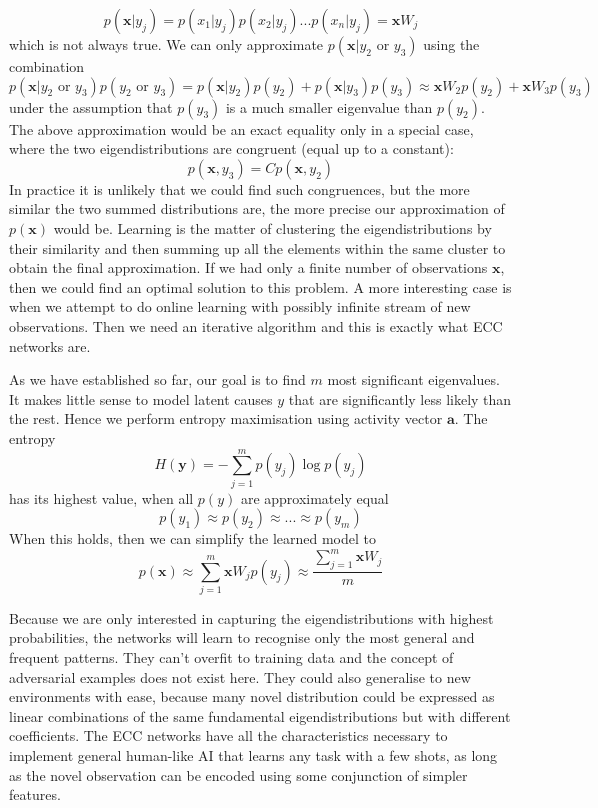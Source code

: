 \documentclass[12pt]{article}
\begin{document}
\[
p(\boldsymbol{x}|y_j) = p(x_1|y_j)p(x_2|y_j)...p(x_n|y_j) = \boldsymbol{x} W_j
\]
which is not always true. We can only approximate $p(\boldsymbol{x}|y_2\text{ or }y_3)$
using the combination
\[
p(\boldsymbol{x}|y_2\text{ or }y_3) p(y_2\text{ or }y_3)= p(\boldsymbol{x}|y_2) p(y_2)+p(\boldsymbol{x}|y_3) p(y_3) \approx \boldsymbol{x}W_2p(y_2) + \boldsymbol{x}W_3 p(y_3)
\]
under the assumption that $p(y_3)$ is a much smaller eigenvalue than $p(y_2)$.
The above approximation would be an exact equality only in a special case, where the two eigendistributions are congruent (equal up to a constant):
\[p(\boldsymbol{x},y_3)=C p(\boldsymbol{x},y_2)\]
In practice it is unlikely that we could find such congruences, but the more similar the two summed distributions are, the more precise our approximation of $p(\boldsymbol{x})$ would be.
Learning is the matter of clustering the eigendistributions by their similarity and then summing up all the elements within the same cluster to obtain the final approximation. If we had only a finite number of observations $\boldsymbol{x}$, then we could find an optimal solution to this problem.
A more interesting case is when we attempt to do online learning with possibly infinite stream of new observations. Then we need an iterative algorithm and this is exactly what ECC networks are. 


As we have established so far, our goal is to find $m$ most significant eigenvalues. It makes little sense to model latent causes $y$ that are significantly less likely than the rest. Hence we perform entropy maximisation using activity vector $\boldsymbol{a}$. The entropy
\[
H(\boldsymbol{y}) = - \sum_{j=1}^{m}p(y_j)\log p(y_j)
\]
has its highest value, when all $p(y)$ are approximately equal
\[
p(y_1)\approx p(y_2)\approx...\approx p(y_m)
\]
When this holds, then we can simplify the learned model to
\[
p(\boldsymbol{x}) \approx \sum_{j=1}^{m}\boldsymbol{x}W_jp(y_j) \approx \frac{\sum_{j=1}^{m}\boldsymbol{x}W_j}{m}
\]

Because we are only interested in capturing the eigendistributions with highest probabilities, the networks will learn to recognise only the most general and frequent patterns. They can't overfit to training data and the concept of adversarial examples does not exist here. They could also generalise to new environments with ease, because many novel distribution could be expressed as linear combinations of the same fundamental eigendistributions but with different coefficients. The ECC networks have all the characteristics necessary to implement general human-like AI that learns any task with a few shots, as long as the novel observation can be encoded using some conjunction of simpler features.
\end{document}
